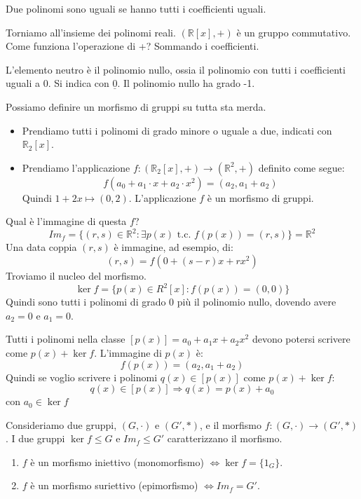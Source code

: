 \begin{defn}
Due polinomi sono uguali se hanno tutti i coefficienti uguali.
\end{defn}

Torniamo all'insieme dei polinomi reali. $\left( \mathbb{R}[x], + \right)$ \`e un gruppo commutativo. Come funziona l'operazione di +? Sommando i coefficienti. 

L'elemento neutro \`e il polinomio nullo, ossia il polinomio con tutti i coefficienti uguali a 0. Si indica con $\underline{0}$. Il polinomio nullo ha grado -1.

Possiamo definire un morfismo di gruppi su tutta sta merda.
\begin{itemize}
    \item Prendiamo tutti i polinomi di grado minore o uguale a due, indicati con $\mathbb{R}_2[x]$.
    \item Prendiamo l'applicazione $f : \left(\mathbb{R}_2[x], + \right) \to \left( \mathbb{R}^2, + \right)$ definito come segue:
    \[
    f \left( a_0 + a_1 \cdot x + a_2 \cdot x^2 \right) = \left( a_2, a_1 + a_2 \right)
    \]
    Quindi $1 + 2 x \mapsto (0, 2)$. L'applicazione $f$ \`e un morfismo di gruppi.
\end{itemize}
Qual \`e l'immagine di questa $f$? 
\[
Im_f = \{ (r, s) \in \mathbb{R}^2 : \exists p(x) \text{ t.c. } f \left( p(x) \right) = (r,s)\} = \mathbb{R}^2
\]
Una data coppia $(r,s)$ \`e immagine, ad esempio, di:
\[
(r, s) = f(0 + (s - r) x + r x^2)
\]
Troviamo il nucleo del morfismo.
\[
\ker f = \{ p(x) \in R^2[x] : f \left( p(x) \right) = (0, 0)\}
\]
Quindi sono tutti i polinomi di grado 0 pi\`u il polinomio nullo, dovendo avere $a_2 = 0$ e $a_1 = 0$.

Tutti i polinomi nella classe $[p(x)] = a_0 + a_1 x + a_2 x^2$ devono potersi scrivere come $p(x) + \ker f$. L'immagine di $p(x)$ \`e:
\[
f \left( p(x) \right) = (a_2, a_1 + a_2)
\]
Quindi se voglio scrivere i polinomi $q(x) \in [p(x)]$ come $p(x) + \ker f$:
\[
q(x) \in [p(x)] \Rightarrow q(x) = p(x) + a_0
\]
con $a_0 \in \ker f$

Consideriamo due gruppi, $(G, \cdot)$ e $(G', \ast)$, e il morfismo $f : (G, \cdot) \to (G', \ast)$. I due gruppi $\ker f \le G$ e $Im_f \le G'$ caratterizzano il morfismo.
\begin{enumerate}
    \item\label{itm:monomorfismo} $f$ \`e un morfismo iniettivo (monomorfismo) $\Leftrightarrow \ker f = \{ 1_G\}$.
    \item\label{itm:epimorfismo} $f$ \`e un morfismo suriettivo (epimorfismo) $\Leftrightarrow Im_f = G'$.
\end{enumerate}

